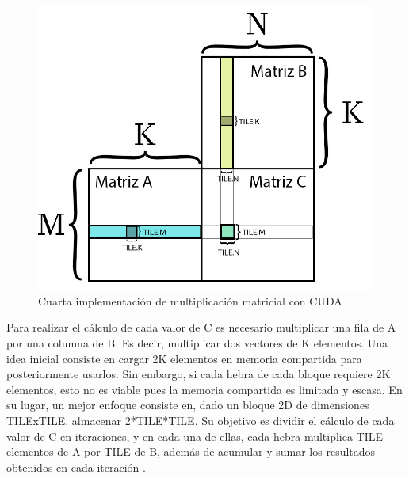 \begin{figure}[H]
	\centering
	\includegraphics[scale=0.3]{imagenes/gemm_tile_v4.jpg}  
	\caption{Cuarta implementación de multiplicación matricial con CUDA}
	\label{fig:mult_matrix_cuda_v4}
\end{figure}
Para realizar el cálculo de cada valor de C es necesario multiplicar una fila de A por una columna de B. Es decir, multiplicar dos vectores de K elementos. Una idea inicial consiste en cargar 2K elementos en memoria compartida para posteriormente usarlos. Sin embargo, si cada hebra de cada bloque requiere 2K elementos, esto no es viable pues la memoria compartida es limitada y escasa. En su lugar, un mejor enfoque consiste en, dado un bloque 2D de dimensiones TILExTILE, almacenar 2*TILE*TILE. Su objetivo es dividir el cálculo de cada valor de C en iteraciones, y en cada una de ellas, cada hebra multiplica TILE elementos de A por TILE de B, además de acumular y sumar los resultados obtenidos en cada iteración \cite{nvidia_mult_matrix_v4}. \\

